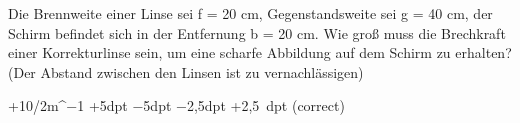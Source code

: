 \documentclass[11pt]{exam}
\begin{document}
\begin{questions}
\vspace{3mm}\question Die Brennweite einer Linse sei f = 20 cm, Gegenstandsweite sei g = 40 cm, der Schirm befindet sich in der Entfernung b = 20 cm. Wie groß muss die Brechkraft einer Korrekturlinse sein, um eine scharfe Abbildung auf dem Schirm zu erhalten? (Der Abstand zwischen den Linsen ist zu vernachlässigen)

\begin{choices}
	\choice +10/2m^−1
	\choice +5dpt
	\choice −5dpt
	\choice −2,5dpt
	\choice +2,5 dpt (correct)
\end{choices}

\vspace{3mm}\end{questions}
\end{document}
